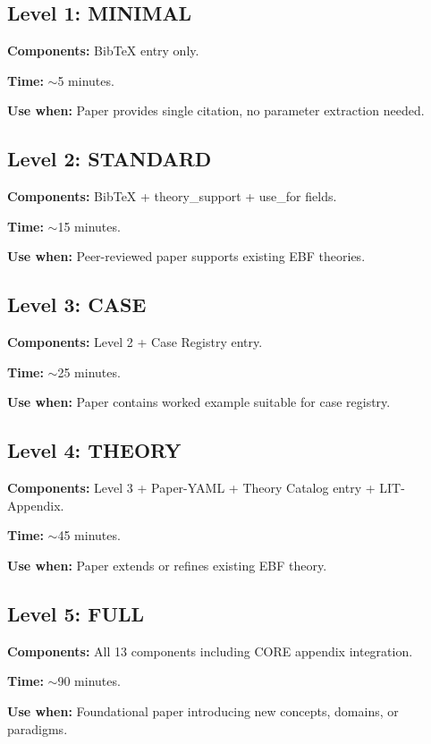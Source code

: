 \subsection{Level 1: MINIMAL}

\textbf{Components:} BibTeX entry only.

\textbf{Time:} $\sim$5 minutes.

\textbf{Use when:} Paper provides single citation, no parameter extraction needed.

\subsection{Level 2: STANDARD}

\textbf{Components:} BibTeX + theory\_support + use\_for fields.

\textbf{Time:} $\sim$15 minutes.

\textbf{Use when:} Peer-reviewed paper supports existing EBF theories.

\subsection{Level 3: CASE}

\textbf{Components:} Level 2 + Case Registry entry.

\textbf{Time:} $\sim$25 minutes.

\textbf{Use when:} Paper contains worked example suitable for case registry.

\subsection{Level 4: THEORY}

\textbf{Components:} Level 3 + Paper-YAML + Theory Catalog entry + LIT-Appendix.

\textbf{Time:} $\sim$45 minutes.

\textbf{Use when:} Paper extends or refines existing EBF theory.

\subsection{Level 5: FULL}

\textbf{Components:} All 13 components including CORE appendix integration.

\textbf{Time:} $\sim$90 minutes.

\textbf{Use when:} Foundational paper introducing new concepts, domains, or paradigms.


